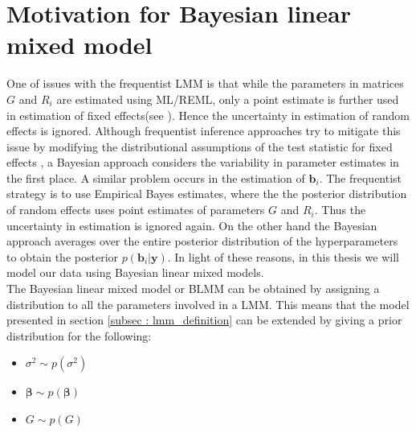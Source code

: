 \section{Motivation for Bayesian linear mixed model}
\label{sec : blmm}
One of issues with the frequentist LMM is that while the parameters in matrices $G$ and $R_i$ are estimated using ML/REML, only a point estimate is further used in estimation of fixed effects(see \cite[chap. 5]{verbeke_linear_2009}). Hence the uncertainty in estimation of random effects is ignored. Although frequentist inference approaches try to mitigate this issue by modifying the distributional assumptions of the test statistic for fixed effects \citep[pg. 56]{verbeke_linear_2009}, a Bayesian approach considers the variability in parameter estimates in the first place. A similar problem occurs in the estimation of $\boldsymbol{b}_i$. The frequentist strategy is to use Empirical Bayes estimates, where the the posterior distribution of random effects uses point estimates of parameters $G$ and $R_i$. Thus the uncertainty in estimation is ignored again. On the other hand the Bayesian approach averages over the entire posterior distribution of the hyperparameters to obtain the posterior $p(\boldsymbol{b}_i|\boldsymbol{y})$. In light of these reasons, in this thesis we will model our data using Bayesian linear mixed models.\\

The Bayesian linear mixed model or BLMM can be obtained by assigning a distribution to all the parameters involved in a LMM. This means that  the model presented in section \ref{subsec : lmm_definition} can be extended by giving a prior distribution for the following:
\begin{itemize}
\item $\sigma^2 \sim p(\sigma^2)$
\item $\boldsymbol{\beta} \sim p(\boldsymbol{\beta})$
\item $G \sim p(G)$
\end{itemize}

